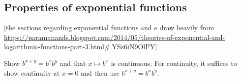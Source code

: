 \begin{comment}
this implies

\begin{align*}
    \int_a^b S \spc dT :=
    \begin{cases}
        \int_a^b S_T & T \neq \overline{S} \text{ and $T$ is a preferred letter of $S$} \\
        b - a & T \neq \overline{S} \text{ and $T$ is not a preferred letter of $S$} \\
        \int_{\overline{S}(a)}^{\overline{S}(b)} S_{\overline{S}} & T = \overline{S}
    \end{cases}.
\end{align*}

gives us change of variables theorem for definite integrals

\begin{mdframed}
    If $g$ and $f$ are functions, $f$ is the preferred letter of $g$, and $x$ is the preferred letter of $f$, then
        
    \begin{align*}
        \int_a^b g \frac{df}{dx} dx = \int_{f(a)}^{f(b)} g \spc df.
    \end{align*}
\end{mdframed}

\subsubsection*{The actual physicist's perspective on functions and the chain rule}

Unfortunately, many calculus and physics textbooks conflate functions with functions evaluated on inputs, and operate under the nonsensical convention that $S(T)$ should be interpreted to mean either $S_T$ or $S_T(T)$, depending on context. This can make things really confusing.

\end{comment}


\subsection*{Properties of exponential functions}

[the sections regarding exponential functions and $e$ draw heavily from \url{https://paramanands.blogspot.com/2014/05/theories-of-exponential-and-logarithmic-functions-part-3.html#.YSz6iN9OlPY}]

Show $b^{x + y} = b^x b^y$ and that $x \mapsto b^x$ is continuous. For continuity, it suffices to show continuity at $x = 0$ and then use $b^{x + y} = b^x b^y$.


